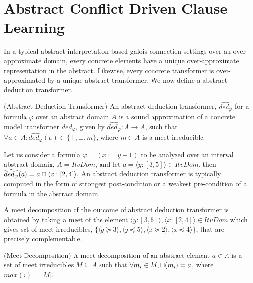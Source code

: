 \section{Abstract Conflict Driven Clause Learning}
In a typical abstract interpretation based galois-connection settings over 
an over-approximate domain, every concrete elements have a unique over-approximate 
representation in the abstract.  Likewise, every concrete transformer is
over-approximated by a unique abstract transformer.  We now define a abstract 
deduction transformer.  

\begin{definition}{(Abstract Deduction Transformer)} An abstract deduction
transformer, $\widehat{ded_{\varphi}}$ for a formula $\varphi$ over an abstract 
domain $A$ is a sound approximation of a concrete model transformer
$ded_{\varphi}$, given by $\widehat{ded_{\varphi}} : A \rightarrow A$, such that 
$\forall a \in A: \widehat{ded_{\varphi}}(a) \in \{\top, \bot, m\}$, where 
$m \in A$ is a meet irreducible.   
\end{definition}

Let us consider a formula $\varphi = (x:=y-1)$ to be analyzed over 
an interval abstract domain, $A = ItvDom$, and let $a = \langle y:[3, 5]
\rangle \in ItvDom$, then $\widehat{ded_{\varphi}}(a) = a \sqcap \langle x:[2, 4]
\rangle$.  An abstract deduction transformer is typically computed in the form 
of strongest post-condition or a weakest pre-condition of a formula in the 
abstract domain.  

A meet decomposition of the outcome of abstract deduction transformer 
is obtained by taking a meet of the element $\langle y:[3, 5] \rangle, 
\langle x:[2, 4] \rangle \in ItvDom$ which gives set of meet irreducibles, 
$\{ \langle y \succeq 3 \rangle, \langle y \preceq 5 \rangle, 
\langle x \succeq 2 \rangle, \langle x \preceq 4 \rangle \}$, that are 
precisely complementable.

\begin{definition}{(Meet Decomposition)} A meet decomposition of an abstract
element $a \in A$ is a set of meet irreducibles $M \subseteq A$ such that 
$\forall m_i \in M, \sqcap(m_i) = a$, where $max(i) = |M|$.
\end{definition}
 

